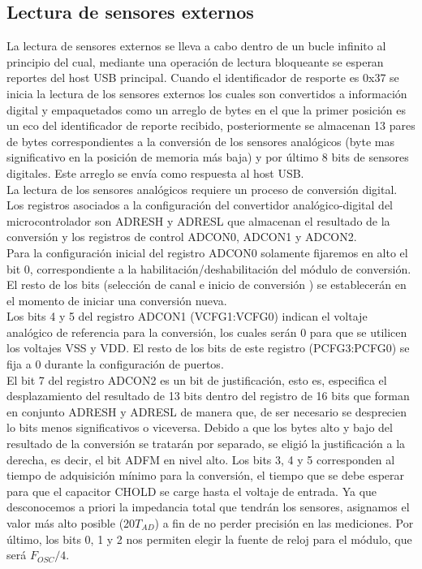 \documentclass[letterpaper,openright,12pt]{book}
\begin{document}
\subsection{Lectura de sensores externos}
La lectura de sensores externos se lleva a cabo dentro de un bucle infinito al principio del cual, mediante una operación de lectura bloqueante se esperan reportes del host USB principal. Cuando el identificador de resporte es 0x37 se inicia la lectura de los sensores externos los cuales son convertidos a información digital y empaquetados como un arreglo de bytes en el que la primer posición es un eco del identificador de reporte recibido, posteriormente se almacenan 13 pares de bytes correspondientes a la conversión de los sensores analógicos (byte mas significativo en la posición de memoria más baja) y por último 8 bits de sensores digitales. Este arreglo se envía como respuesta al host USB.\\
La lectura de los sensores analógicos requiere un proceso de conversión digital. Los registros asociados a la configuración del convertidor analógico-digital del microcontrolador son ADRESH y ADRESL que almacenan el resultado de la conversión y los registros de control ADCON0, ADCON1 y ADCON2.\\
Para la configuración inicial del registro ADCON0 solamente fijaremos en alto el bit 0, correspondiente a la habilitación/deshabilitación del módulo de conversión. El resto de los bits (selección de canal e inicio de conversión ) se establecerán en el momento de iniciar una conversión nueva.\\
Los bits 4 y 5 del registro ADCON1 (VCFG1:VCFG0) indican el voltaje analógico de referencia para la conversión, los cuales serán 0 para que se utilicen los voltajes VSS y VDD. El resto de los bits de este registro (PCFG3:PCFG0) se fija a 0 durante la configuración de puertos.\\
El bit 7 del registro ADCON2 es un bit de justificación, esto es, especifica el desplazamiento del resultado de 13 bits dentro del registro de 16 bits que forman en conjunto ADRESH y ADRESL de manera que, de ser necesario se desprecien lo bits menos significativos o viceversa. Debido a que los bytes alto y bajo del resultado de la conversión se tratarán por separado, se eligió la justificación a la derecha, es decir, el bit ADFM en nivel alto. Los bits 3, 4 y 5 corresponden al tiempo de adquisición mínimo para la conversión, el tiempo que se debe esperar para que el capacitor CHOLD se carge hasta el voltaje de entrada. Ya que desconocemos a priori la impedancia total que tendrán los sensores, asignamos el valor más alto posible (20$T_{AD}$) a fin de no perder precisión en las mediciones. Por último, los bits 0, 1 y 2 nos permiten elegir la fuente de reloj para el módulo, que  será $F_{OSC}/4$.
\end{document}
